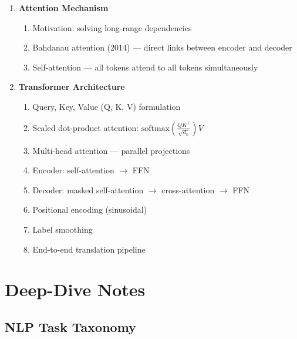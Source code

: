 \documentclass[11pt, a4paper]{article}
\begin{document}
\begin{enumerate}[label=\textbf{\arabic*.}, leftmargin=2em]
\begin{enumerate}[label=\arabic{enumi}.\arabic*]
      \item Long-range dependency limitations
    \end{enumerate}
  \item \textbf{Attention Mechanism}
    \begin{enumerate}[label=\arabic{enumi}.\arabic*]
      \item Motivation: solving long-range dependencies
      \item Bahdanau attention (2014) --- direct links between encoder and decoder
      \item Self-attention --- all tokens attend to all tokens simultaneously
    \end{enumerate}
  \item \textbf{Transformer Architecture}
    \begin{enumerate}[label=\arabic{enumi}.\arabic*]
      \item Query, Key, Value (Q, K, V) formulation
      \item Scaled dot-product attention: $\text{softmax}\!\left(\frac{QK^\top}{\sqrt{d_k}}\right)V$
      \item Multi-head attention --- parallel projections
      \item Encoder: self-attention $\to$ FFN
      \item Decoder: masked self-attention $\to$ cross-attention $\to$ FFN
      \item Positional encoding (sinusoidal)
      \item Label smoothing
      \item End-to-end translation pipeline
    \end{enumerate}
\end{enumerate}

\newpage
\section{Deep-Dive Notes}

\subsection{NLP Task Taxonomy}
\end{document}
